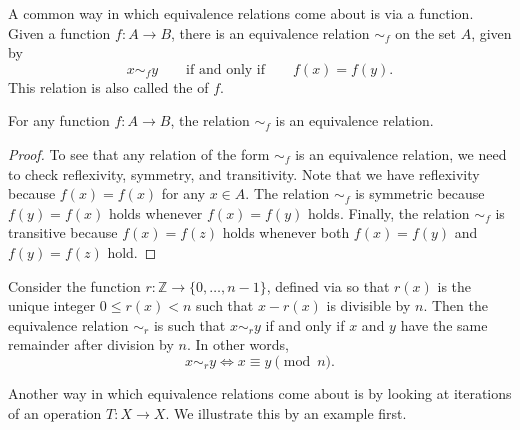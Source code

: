 A common way in which equivalence relations come about is via a function. Given a function $f:A\to B$, there is an equivalence relation $\sim_f$ on the set $A$, given by
\begin{equation*}
  x\sim_f y \qquad\text{if and only if}\qquad f(x)=f(y).
\end{equation*}
This relation is also called the  of $f$.

\begin{proposition}
  For any function $f:A\to B$, the relation $\sim_f$ is an equivalence relation.
\end{proposition}

\begin{proof}
  To see that any relation of the form $\sim_f$ is an equivalence relation, we need to check reflexivity, symmetry, and transitivity. Note that we have reflexivity because $f(x)=f(x)$ for any $x\in A$. The relation $\sim_f$ is symmetric because $f(y)=f(x)$ holds whenever $f(x)=f(y)$ holds. Finally, the relation $\sim_f$ is transitive because $f(x)=f(z)$ holds whenever both $f(x)=f(y)$ and $f(y)=f(z)$ hold.
\end{proof}

\begin{example}
  Consider the function $r:\mathbb{Z}\to\{0,\ldots,n-1\}$, defined via  so that $r(x)$ is the unique integer $0\leq r(x)<n$ such that $x-r(x)$ is divisible by $n$. Then the equivalence relation $\sim_{r}$ is such that $x\sim_r y$ if and only if $x$ and $y$ have the same remainder after division by $n$. In other words,
  \begin{equation*}
    x\sim_r y \Leftrightarrow x\equiv y\pmod{n}.
  \end{equation*}
\end{example}

Another way in which equivalence relations come about is by looking at iterations of an operation $T:X\to X$. We illustrate this by an example first.

